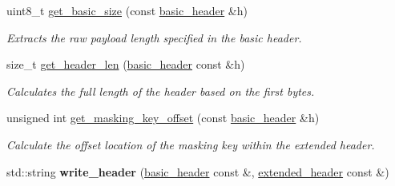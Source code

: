\begin{DoxyCompactItemize}
uint8\+\_\+t \hyperlink{namespacewebsocketpp_1_1frame_a2ceb63e6a2fe19964d13363ba2bb9e15}{get\+\_\+basic\+\_\+size} (const \hyperlink{structwebsocketpp_1_1frame_1_1basic__header}{basic\+\_\+header} \&h)
\begin{DoxyCompactList}\small\item\em Extracts the raw payload length specified in the basic header. \end{DoxyCompactList}\item 
size\+\_\+t \hyperlink{namespacewebsocketpp_1_1frame_abd4f23c906cc48fb3b34603fd4284b01}{get\+\_\+header\+\_\+len} (\hyperlink{structwebsocketpp_1_1frame_1_1basic__header}{basic\+\_\+header} const \&h)
\begin{DoxyCompactList}\small\item\em Calculates the full length of the header based on the first bytes. \end{DoxyCompactList}\item 
unsigned int \hyperlink{namespacewebsocketpp_1_1frame_a001d6c5e538d5eb1ef5ddc21aeb61ee3}{get\+\_\+masking\+\_\+key\+\_\+offset} (const \hyperlink{structwebsocketpp_1_1frame_1_1basic__header}{basic\+\_\+header} \&h)
\begin{DoxyCompactList}\small\item\em Calculate the offset location of the masking key within the extended header. \end{DoxyCompactList}\item 
std\+::string {\bfseries write\+\_\+header} (\hyperlink{structwebsocketpp_1_1frame_1_1basic__header}{basic\+\_\+header} const \&, \hyperlink{structwebsocketpp_1_1frame_1_1extended__header}{extended\+\_\+header} const \&)\hypertarget{namespacewebsocketpp_1_1frame_a510f505f5208e9f3a06e32e50b9b4e89}{}\label{namespacewebsocketpp_1_1frame_a510f505f5208e9f3a06e32e50b9b4e89}


\end{DoxyCompactItemize}
